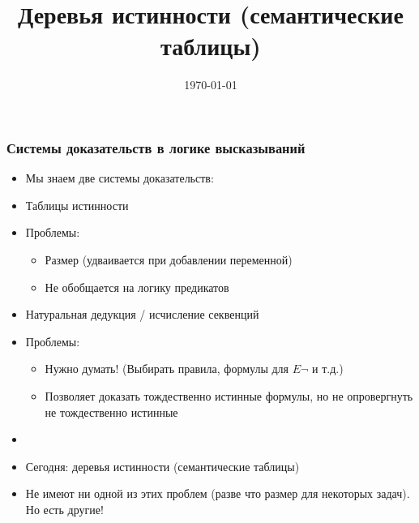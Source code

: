 \documentclass[10pt]{beamer}
\title{Деревья истинности (семантические таблицы)}
\date{\today}
\begin{document}
\begin{frame}[plain]
\maketitle
\end{frame}

\begin{frame}
\frametitle{Системы доказательств в логике высказываний}
\begin{itemize}
    \item Мы знаем две системы доказательств:
    \pause
    \item Таблицы истинности
    \item[] Проблемы:
    \pause
    \begin{itemize}
        \item Размер (удваивается при добавлении переменной)
        \item Не обобщается на логику предикатов
    \end{itemize}
    \pause
    \item Натуральная дедукция / исчисление секвенций
    \item[] Проблемы:
    \pause
    \begin{itemize}
        \item Нужно думать! (Выбирать правила, формулы для \(E\neg\) и т.д.)
        \item Позволяет доказать тождественно истинные формулы, но не опровергнуть не тождественно истинные
    \end{itemize}
    \item[]
    \item Сегодня: деревья истинности (семантические таблицы)
    \item Не имеют ни одной из этих проблем (разве что размер для некоторых задач). Но есть другие!
\end{itemize}
\end{frame}
\end{document}
